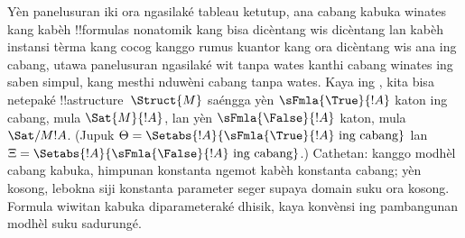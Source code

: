 \documentclass[../../../include/open-logic-section]{subfiles}
\begin{document}
Yèn panelusuran iki ora ngasilaké tableau ketutup,
ana cabang kabuka winates kang kabèh !!{formula}s
nonatomik kang bisa dicèntang wis dicèntang lan
kabèh instansi tèrma kang cocog kanggo rumus
kuantor kang ora dicèntang wis ana ing cabang,
utawa panelusuran ngasilaké
wit tanpa wates kanthi cabang winates ing saben
simpul, kang mesthi nduwèni cabang tanpa wates.
Kaya ing , kita bisa netepaké
!!a{structure}~$\Struct{M}$ saéngga yèn
$\sFmla{\True}{!A}$ katon ing cabang, mula
$\Sat{M}{!A}$, lan yèn $\sFmla{\False}{!A}$
katon, mula $\Sat/{M}{!A}$. (Jupuk $\Theta =
\Setabs{!A}{\sFmla{\True}{!A} \text{ ing cabang}}$
lan $\Xi =
\Setabs{!A}{\sFmla{\False}{!A} \text{ ing cabang}}$.)
Cathetan: kanggo modhèl cabang kabuka, himpunan konstanta ngemot kabèh konstanta cabang; yèn kosong, lebokna siji konstanta parameter seger supaya domain suku ora kosong. Formula wiwitan kabuka diparameteraké dhisik, kaya konvènsi ing pambangunan modhèl suku sadurungé.
\end{document}
